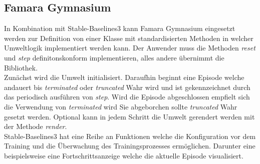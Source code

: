 \subsection{\label{gymnasium}Famara Gymnasium}
In Kombination mit Stable-Baselines3 kann Famara Gymnasium eingesetzt werden zur Definition von einer Klasse mit standardisierten Methoden in welcher Umweltlogik implementiert werden kann. Der Anwender muss die Methoden   \textit{reset} und \textit{step} definitonskonform implementieren, alles andere übernimmt die Bibliothek.\\
Zunächst wird die Umwelt initialisiert. Daraufhin beginnt eine Episode welche andauert bis \textit{terminated} oder \textit{truncated} Wahr wird und ist gekennzeichnet durch das periodisch ausführen von \textit{step}. Wird die Episode abgeschlossen empfielt sich die Verwendung von \textit{terminated} wird Sie abgeborchen sollte \textit{truncated} Wahr gesetzt werden. Optional kann in jedem Schritt die Umwelt gerendert werden mit der Methode \textit{render}.\\
Stable-Baselines3 hat eine Reihe an Funktionen welche die Konfiguration vor dem Training und die Überwachung des Trainingsprozesses ermöglichen. Darunter eine beispielsweise eine Fortschrittsanzeige welche die aktuelle Episode visualisiert.
\begin{center}
\end{center}

